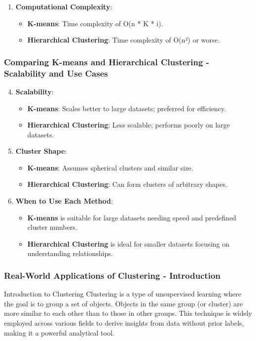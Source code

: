 \documentclass[aspectratio=169]{beamer}
\begin{document}
\begin{frame}[fragile]
\begin{enumerate}
        \item \textbf{Computational Complexity}:
        \begin{itemize}
            \item \textbf{K-means}: Time complexity of O(n * K * i).
            \item \textbf{Hierarchical Clustering}: Time complexity of O(n²) or worse.
        \end{itemize}
    \end{enumerate}
\end{frame}

\begin{frame}[fragile]
    \frametitle{Comparing K-means and Hierarchical Clustering - Scalability and Use Cases}
    \begin{enumerate}
        \setcounter{enumi}{3}
        \item \textbf{Scalability}:
        \begin{itemize}
            \item \textbf{K-means}: Scales better to large datasets; preferred for efficiency.
            \item \textbf{Hierarchical Clustering}: Less scalable; performs poorly on large datasets.
        \end{itemize}

        \item \textbf{Cluster Shape}:
        \begin{itemize}
            \item \textbf{K-means}: Assumes spherical clusters and similar size.
            \item \textbf{Hierarchical Clustering}: Can form clusters of arbitrary shapes.
        \end{itemize}
        
        \item \textbf{When to Use Each Method}:
        \begin{itemize}
            \item \textbf{K-means} is suitable for large datasets needing speed and predefined cluster numbers.
            \item \textbf{Hierarchical Clustering} is ideal for smaller datasets focusing on understanding relationships.
        \end{itemize}
    \end{enumerate}
\end{frame}

\begin{frame}[fragile]
    \frametitle{Real-World Applications of Clustering - Introduction}
    \begin{block}{Introduction to Clustering}
        Clustering is a type of unsupervised learning where the goal is to group a set of objects. 
        Objects in the same group (or cluster) are more similar to each other than to those in other groups. 
        This technique is widely employed across various fields to derive insights from data without prior labels, 
        making it a powerful analytical tool.
    \end{block}
\end{frame}
\end{document}
